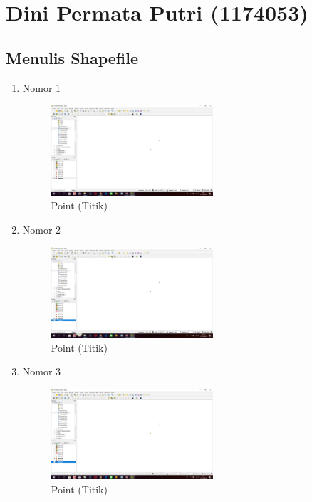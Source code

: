 \section{Dini Permata Putri (1174053)}
\subsection{Menulis Shapefile}

\begin{enumerate}
	\item Nomor 1
	
	\begin{figure}[H]
		\includegraphics[width=6cm]{figures/Tugas2/1174053/no1.png}
		\centering
		\caption{Point (Titik)}
	\end{figure}
	
	\item Nomor 2
	
	\begin{figure}[H]
		\includegraphics[width=6cm]{figures/Tugas2/1174053/no2.png}
		\centering
		\caption{Point (Titik)}
	\end{figure}

	\item Nomor 3
	
	\begin{figure}[H]
		\includegraphics[width=6cm]{figures/Tugas2/1174053/no3.png}
		\centering
		\caption{Point (Titik)}
	\end{figure}
	

\end{enumerate}
